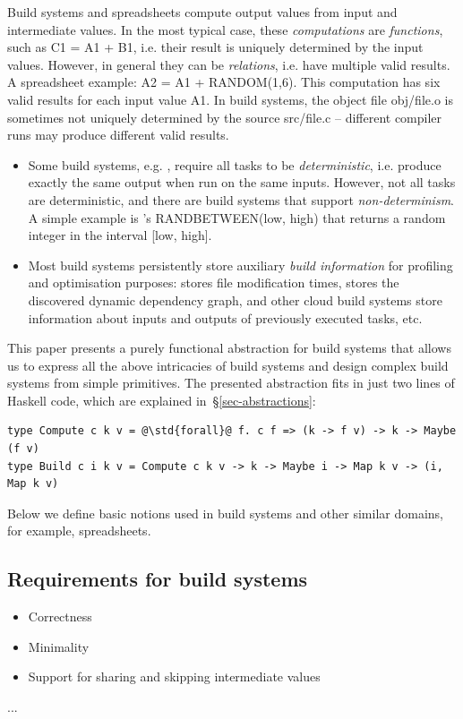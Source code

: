 Build systems and spreadsheets compute output values from input and intermediate
values. In the most typical case, these \emph{computations} are \emph{functions},
such as \textsf{C1 = A1 + B1}, i.e. their result is uniquely determined by the
input values. However, in general they can be \emph{relations}, i.e. have
multiple valid results. A spreadsheet example: \textsf{A2 = A1 + RANDOM(1,6)}.
This computation has six valid results for each input value \textsf{A1}. In
build systems, the object file \textsf{obj/file.o} is sometimes not uniquely
determined by the source \textsf{src/file.c} -- different compiler runs may
produce different valid results.


\begin{itemize}

    \item Some build systems, e.g. \Buck, require all tasks to be
    \emph{deterministic}, i.e. produce exactly the same output when run on the
    same inputs. However, not all tasks are deterministic, and there are build
    systems that support \emph{non-determinism}. A simple example is \Excel's
    \textsf{RANDBETWEEN(low, high)} that returns a random integer in the
    interval \textsf{[low, high]}.

    \item Most build systems persistently store auxiliary \emph{build
    information} for profiling and optimisation purposes: \Make stores file
    modification times, \Shake stores the discovered dynamic dependency graph,
    \Bazel and other cloud build systems store information about inputs and
    outputs of previously executed tasks, etc.
\end{itemize}

This paper presents a purely functional abstraction for build systems that
allows us to express all the above intricacies of build systems and design
complex build systems from simple primitives. The presented abstraction fits in
just two lines of Haskell code, which are explained
in~\S\ref{sec-abstractions}:

\begin{verbatim}
type Compute c k v = @\std{forall}@ f. c f => (k -> f v) -> k -> Maybe (f v)
type Build c i k v = Compute c k v -> k -> Maybe i -> Map k v -> (i, Map k v)
\end{verbatim}


Below we define basic notions used in build systems and other similar domains,
for example, spreadsheets.


\subsection{Requirements for build systems}

\begin{itemize}
    \item Correctness
    \item Minimality
    \item Support for sharing and skipping intermediate values
\end{itemize}
...
